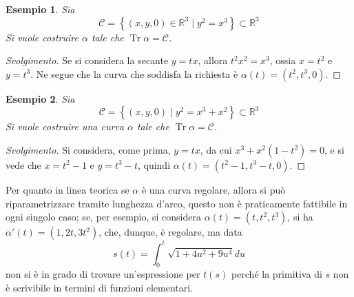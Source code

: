 \documentclass[12pt]{article}
\theoremstyle{style}
\newtheorem{esempio}{Esempio}[section]
\newenvironment{svolgimento}{\renewcommand\qedsymbol{$\blacksquare$}\begin{proof}[Svolgimento]}{\end{proof}}
\numberwithin{equation}{subsection}
\begin{document}
\begin{esempio}
Sia 
\[
\mathcal{C}  = \left\{ (x,y,0) \in \mathbb{R}^3  \mid y^2 = x^3 \right\}  \subset \mathbb{R}^3
\] 
Si vuole costruire $\alpha $ tale che $\operatorname{Tr}\alpha  = \mathcal{C} $.
\end{esempio}
\begin{svolgimento}
	Se si considera la secante $y = tx$, allora $t^2 x^2 = x^3$, ossia $x= t^2$ e $y = t^3$.
	Ne segue che la curva che soddisfa la richiesta \`e $\alpha (t) = (t^2 , t^3,0)$.
\end{svolgimento}
\begin{esempio}
Sia 
\[
\mathcal{C}  = \left\{ (x,y,0)  \mid y^2 = x^3 + x^2 \right\} \subset \mathbb{R}^3
\] 
Si vuole costruire una curva $\alpha $ tale che $\operatorname{Tr} \alpha  = \mathcal{C} $.
\end{esempio}
\begin{svolgimento}
	Si considera, come prima, $y=tx $, da cui $x^3 + x^2(1-t^2) = 0$, e si vede che $x = t^2 - 1$ e $y=t^3 -t$, quindi $\alpha (t) = (t^2 - 1, t^3-t,0)$.
\end{svolgimento}
\noindent Per quanto in linea teorica se $\alpha $ \`e una curva regolare, allora si pu\`o riparametrizzare tramite lunghezza d'arco, questo non \`e praticamente fattibile in ogni singolo caso; se, per esempio, si considera $\alpha (t) = (t,t^2,t^3)$, si ha $\alpha '(t) = (1,2t,3t^2)$, che, dunque, \`e regolare, ma data
\[
s(t) = \int_{0} ^t \sqrt{1 + 4u^2 + 9u^4} du
\] 
non si \`e in grado di trovare un'espressione per $t(s)$ perch\'e la primitiva di $s$ non \`e scrivibile in termini di funzioni elementari.
\end{document}
